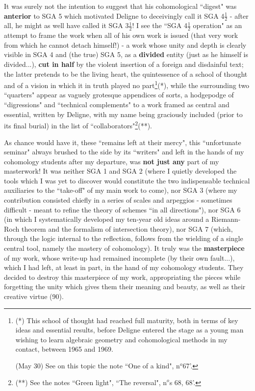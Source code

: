 It was surely not the intention to suggest that his cohomological ``digest" was \textbf{anterior} to SGA 5 which motivated Deligne to deceivingly call it SGA 4$\frac{1}{2}$ - after all, he might as well have called it SGA 3$\frac{1}{2}$! I see the ``SGA 4$\frac{1}{2}$ operation" as an attempt to frame the work when all of his own work is issued (that very work from which he cannot detach himself!) - a work whose unity and depth is clearly visible in SGA 4 and (the true) SGA 5, as a \textbf{divided} entity (just as he himself is divided...), \textbf{cut in half} by the violent insertion of a foreign and disdainful text; the latter pretends to be the living heart, the quintessence of a school of thought and of a vision in which it in truth played no part\footnote{(*) This school of thought had reached full maturity, both in terms of key ideas and essential results, before Deligne entered the stage as a young man wishing to learn algebraic geometry and cohomological methods in my contact, between 1965 and 1969.

(May 30) See on this topic the note ``One of a kind", n$^o$67'.}(*), while the surrounding two ``quarters" appear as vaguely grotesque appendices of sorts, a hodgepodge of ``digressions" and ``technical complements" to a work framed as central and essential, written by Deligne, with my name being graciously included (prior to its final burial) in the list of ``collaborators"\footnote{(**) See the notes ``Green light", ``The reversal", n$^o$s 68, 68'.}(**).

As chance would have it, these ``remains left at their mercy", this ``unfortunate seminar" always brushed to the side by its ``writers" and left in the hands of my cohomology students after my departure, was \textbf{not just any} part of my masterwork! It was neither SGA 1 and SGA 2 (where I quietly developed the tools which I was yet to discover would constitute the two indispensable technical auxiliaries to the ``take-off" of my main work to come), nor SGA 3 (where my contribution consisted chiefly in a series of scales and arpeggios - sometimes difficult - meant to refine the theory of schemes ``in all directions"), nor SGA 6 (in which I systematically developed my ten-year old ideas around a Riemann-Roch theorem and the formalism of intersection theory), nor SGA 7 (which, through the logic internal to the reflection, follows from the wielding of a single central tool, namely the mastery of cohomology). It truly was the \textbf{masterpiece} of my work, whose write-up had remained incomplete (by their own fault...), which I had left, at least in part, in the hand of my cohomology students. They decided to destroy this masterpiece of my work, appropriating the pieces while forgetting the unity which gives them their meaning and beauty, as well as their creative virtue (90).


